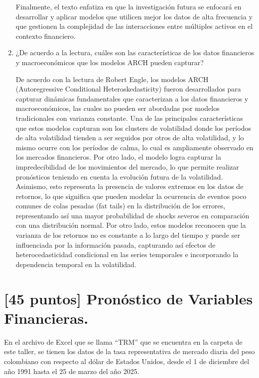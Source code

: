 \documentclass{article}
\theoremstyle{remark}
\theoremstyle{definition}
\begin{document}
\begin{enumerate}[label = \emph{\alph*})]
\begin{tcolorbox}[title=Soluci\'on 1.a]
            Finalmente, el texto enfatiza en que la investigación futura se enfocará en desarrollar y aplicar modelos que utilicen mejor los datos de alta frecuencia y que gestionen la complejidad de las interacciones entre múltiples activos en el contexto financiero. 
        \end{tcolorbox}
    \item {¿De acuerdo a la lectura, cu\'ales son las caracter\'isticas de los datos financieros y macroecon\'omicos que los modelos ARCH pueden capturar?}
        \begin{tcolorbox}[title=Soluci\'on 1.b]
            De acuerdo con la lectura de Robert Engle, los modelos ARCH (Autoregressive Conditional Heteroskedasticity) fueron desarrollados para capturar dinámicas fundamentales que caracterizan a los datos financieros y macroeconómicos, las cuales no pueden ser abordadas por modelos tradicionales con varianza constante. Una de las principales características que estos modelos capturan son los clusters de volatilidad donde los períodos de alta volatilidad tienden a ser seguidos por otros de alta volatilidad, y lo mismo ocurre con los períodos de calma, lo cual es ampliamente observado en los mercados financieros. Por otro lado, el modelo logra capturar la impredecibilidad de los movimientos del mercado, lo que permite realizar pronósticos teniendo en cuenta la evolución futura de la volatilidad.  Asimismo, esto representa la presencia de valores extremos en los datos de retornos, lo que significa que pueden modelar la ocurrencia de eventos poco comunes de colas pesadas (fat tails) en la distribución de los errores, representando así una mayor probabilidad de shocks severos en comparación con una distribución normal. Por otro lado, estos modelos reconocen que la varianza de los retornos no es constante a lo largo del tiempo y puede ser influenciada por la información pasada, capturando así efectos de heterocedasticidad condicional en las series temporales e incorporando la dependencia temporal en la volatilidad. 
        \end{tcolorbox}
\end{enumerate}

\section{[45 puntos] Pron\'ostico de Variables Financieras.}

{En el archivo de Excel que se llama ``TRM'' que se encuentra en la carpeta de este taller, se tienen los datos de la tasa representativa de mercado diaria del peso colombiano con respecto al d\'olar de Estados Unidos, desde el 1 de diciembre del año 1991 hasta el 25 de marzo del año 2025.}
\end{document}
